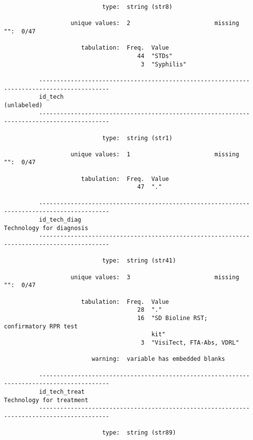 \documentclass{article}
\begin{document}
\begin{verbatim}
                            type:  string (str8)
          
                   unique values:  2                        missing "":  0/47
          
                      tabulation:  Freq.  Value
                                      44  "STDs"
                                       3  "Syphilis"
          
          ------------------------------------------------------------------------------------------
          id_tech                                                                        (unlabeled)
          ------------------------------------------------------------------------------------------
          
                            type:  string (str1)
          
                   unique values:  1                        missing "":  0/47
          
                      tabulation:  Freq.  Value
                                      47  "."
          
          ------------------------------------------------------------------------------------------
          id_tech_diag                                                      Technology for diagnosis
          ------------------------------------------------------------------------------------------
          
                            type:  string (str41)
          
                   unique values:  3                        missing "":  0/47
          
                      tabulation:  Freq.  Value
                                      28  "."
                                      16  "SD Bioline RST; confirmatory RPR test
                                          kit"
                                       3  "VisiTect, FTA-Abs, VDRL"
          
                         warning:  variable has embedded blanks
          
          ------------------------------------------------------------------------------------------
          id_tech_treat                                                     Technology for treatment
          ------------------------------------------------------------------------------------------
          
                            type:  string (str89)
          

\end{verbatim}
\end{document}
